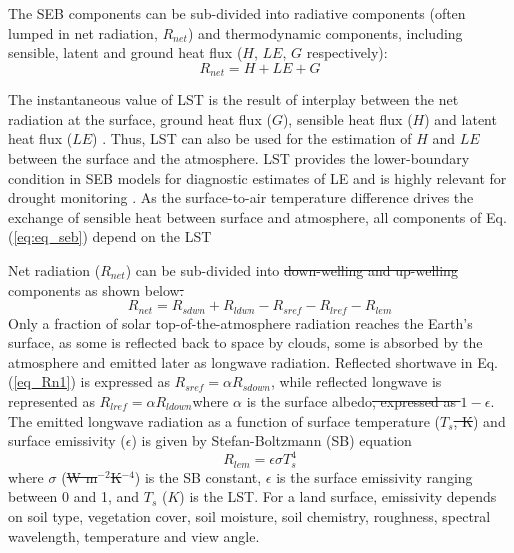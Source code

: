 \documentclass[fleqn,10pt]{wlscirep}
\providecommand{\DIFaddtex}[1]{{\protect\color{blue}\uwave{#1}}} %
\providecommand{\DIFdeltex}[1]{{\protect\color{red}\sout{#1}}}                      %
\providecommand{\DIFaddbegin}{} %
\providecommand{\DIFaddend}{} %
\providecommand{\DIFdelbegin}{} %
\providecommand{\DIFdelend}{} %
\providecommand{\DIFadd}[1]{\texorpdfstring{\DIFaddtex{#1}}{#1}} %
\providecommand{\DIFdel}[1]{\texorpdfstring{\DIFdeltex{#1}}{}} %
\begin{document}
The SEB components can be sub-divided into radiative components (often lumped in net radiation, $R_{net}$) and thermodynamic components, including sensible, latent and ground heat flux ($H$, $LE$, $G$ respectively):
\begin{equation}\label{eq:eq_seb}
R_{net} = H + LE + G 
\end{equation}

The instantaneous value of LST is the result of interplay between the net radiation at the surface, ground heat flux ($G$), sensible heat flux ($H$) and latent heat flux ($LE$) \cite{wang2013global}. Thus, LST can also be used for the estimation of $H$ \cite{sun1995relationship} and $LE$ \cite{jacob2001comprehensive} between the surface and the atmosphere. LST provides the lower-boundary condition in SEB models for diagnostic estimates of LE  and is highly relevant for drought monitoring \cite{trebs2021role,mallick2016canopy,mallick2015reintroducing}. As the surface-to-air temperature difference drives the exchange of sensible heat between surface and atmosphere, all components of Eq. (\ref{eq:eq_seb}) depend on the LST\DIFaddbegin \DIFadd{.
 }\DIFaddend 

 
 Net radiation ($R_{net}$) can be sub-divided into \DIFdelbegin \DIFdel{down-welling and up-welling }\DIFdelend \DIFaddbegin \DIFadd{downwelling and upwelling }\DIFaddend components \cite{verma2016global} as shown below\DIFdelbegin \DIFdel{.
}\DIFdelend \DIFaddbegin \DIFadd{:
}\DIFaddend \begin{equation}\label{eq_Rn1}
R_{net} = R_{sdwn} + R_{ldwn} - R_{sref} - R_{lref} - R_{lem}
\end{equation}
 Only a fraction of solar top-of-the-atmosphere radiation reaches the Earth's surface, as some is reflected back to space by clouds, some is absorbed by the atmosphere and emitted later as longwave radiation. Reflected shortwave in Eq. ({\ref{eq_Rn1}}) is expressed as $R_{sref} = \alpha R_{sdown}$, while reflected longwave is represented as $R_{lref} = \alpha R_{ldown}$\DIFaddbegin \DIFadd{, }\DIFaddend where $\alpha$ is the surface albedo\DIFdelbegin \DIFdel{, expressed as $1 - \epsilon$}\DIFdelend . The emitted longwave radiation as a function of surface temperature ($T_s$\DIFdelbegin \DIFdel{, K}\DIFdelend ) and surface emissivity ($\epsilon$) is given by Stefan-Boltzmann (SB) equation \cite{lhomme1988radiative}
\begin{equation}\label{eq_Rlem}
R_{lem}= \epsilon \sigma T_{s}^{4}
\end{equation}
where $\sigma$ (\DIFdelbegin \DIFdel{W m$^{-2}$K$^{-4}$}\DIFdelend \DIFaddbegin \DIFadd{$Wm^{-2}K^{-4}$}\DIFaddend ) is the SB constant, $\epsilon$ is the surface emissivity ranging between 0 and 1, and $T_{s}$ (\DIFdelbegin \DIFdel{$K$}\DIFdelend \DIFaddbegin \DIFadd{K}\DIFaddend ) is the LST. For a land surface, emissivity depends on soil type, vegetation cover, soil moisture, soil chemistry, roughness, spectral wavelength, temperature and view angle\cite{norman1995terminology}. 
\end{document}
